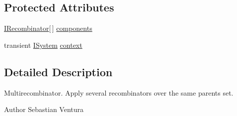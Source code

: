 \subsection*{Protected Attributes}
\begin{DoxyCompactItemize}
\item 
\hyperlink{interfacenet_1_1sf_1_1jclec_1_1_i_recombinator}{I\-Recombinator}\mbox{[}$\,$\mbox{]} \hyperlink{classnet_1_1sf_1_1jclec_1_1base_1_1_multi_recombinator_a343664f4072209d95af0b554548b522a}{components}
\item 
transient \hyperlink{interfacenet_1_1sf_1_1jclec_1_1_i_system}{I\-System} \hyperlink{classnet_1_1sf_1_1jclec_1_1base_1_1_multi_recombinator_ab501674a548d5e3da0f711a99188eeb2}{context}
\end{DoxyCompactItemize}


\subsection{Detailed Description}
Multirecombinator. Apply several recombinators over the same parents set.

\begin{DoxyAuthor}{Author}
Sebastian Ventura 
\end{DoxyAuthor}


